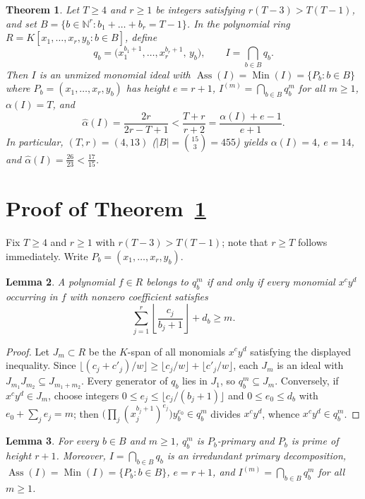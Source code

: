 \documentclass[11pt]{article}
\newtheorem{theorem}{Theorem}
\newtheorem{lemma}[theorem]{Lemma}
\newcommand{\Ass}{\operatorname{Ass}}
\newcommand{\Min}{\operatorname{Min}}
\begin{document}
\begin{theorem}\label{thm:main}
Let $T \ge 4$ and $r \ge 1$ be integers satisfying $r(T - 3) > T(T - 1)$, and set $B = \{b \in \mathbb{N}^r : b_1 + \dots + b_r = T - 1\}$. In the polynomial ring $R = K[x_1, \dots, x_r, y_b : b \in B]$, define
\[
  q_b = \bigl(x_1^{b_1 + 1}, \dots, x_r^{b_r + 1},\, y_b\bigr), \qquad I = \bigcap_{b \in B} q_b.
\]
Then $I$ is an unmixed monomial ideal with $\Ass(I) = \Min(I) = \{P_b : b \in B\}$ where $P_b = (x_1, \dots, x_r, y_b)$ has height $e = r + 1$, $I^{(m)} = \bigcap_{b \in B} q_b^m$ for all $m \ge 1$, $\alpha(I) = T$, and
\[
  \widehat{\alpha}(I) = \frac{2r}{2r - T + 1} < \frac{T + r}{r + 2} = \frac{\alpha(I) + e - 1}{e + 1}.
\]
In particular, $(T, r) = (4, 13)$ ($|B| = \binom{15}{3} = 455$) yields $\alpha(I) = 4$, $e = 14$, and $\widehat{\alpha}(I) = \frac{26}{23} < \frac{17}{15}$.
\end{theorem}

\section{Proof of Theorem~\ref{thm:main}}

Fix $T \ge 4$ and $r \ge 1$ with $r(T - 3) > T(T - 1)$; note that $r \ge T$ follows immediately. Write $P_b = (x_1, \dots, x_r, y_b)$.

\begin{lemma}\label{lem:mem}
A polynomial $f \in R$ belongs to $q_b^m$ if and only if every monomial $x^c y^d$ occurring in $f$ with nonzero coefficient satisfies
\[
  \sum_{j=1}^r \left\lfloor \frac{c_j}{b_j + 1} \right\rfloor + d_b \ge m.
\]
\end{lemma}

\begin{proof}
Let $J_m \subset R$ be the $K$-span of all monomials $x^c y^d$ satisfying the displayed inequality. Since $\lfloor (c_j + c'_j)/w \rfloor \ge \lfloor c_j/w \rfloor + \lfloor c'_j/w \rfloor$, each $J_m$ is an ideal with $J_{m_1} J_{m_2} \subseteq J_{m_1 + m_2}$. Every generator of $q_b$ lies in $J_1$, so $q_b^m \subseteq J_m$. Conversely, if $x^c y^d \in J_m$, choose integers $0 \le e_j \le \lfloor c_j/(b_j + 1) \rfloor$ and $0 \le e_0 \le d_b$ with $e_0 + \sum_j e_j = m$; then $\bigl(\prod_j (x_j^{b_j+1})^{e_j}\bigr) y_b^{e_0} \in q_b^m$ divides $x^c y^d$, whence $x^c y^d \in q_b^m$.
\end{proof}

\begin{lemma}\label{lem:primary}
For every $b \in B$ and $m \ge 1$, $q_b^m$ is $P_b$-primary and $P_b$ is prime of height $r + 1$. Moreover, $I = \bigcap_{b \in B} q_b$ is an irredundant primary decomposition, $\Ass(I) = \Min(I) = \{P_b : b \in B\}$, $e = r + 1$, and $I^{(m)} = \bigcap_{b \in B} q_b^m$ for all $m \ge 1$.
\end{lemma}
\end{document}

